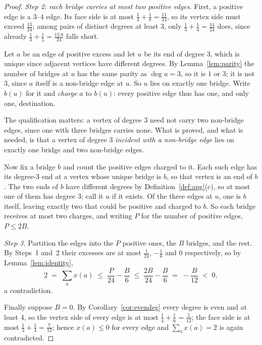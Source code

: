 \documentclass[11pt,a4paper]{amsart}
\theoremstyle{plain}
\theoremstyle{definition}
\begin{document}
\begin{proof}
\smallskip
\emph{Step 2: each bridge carries at most two positive edges.} First, a positive
edge is a $3$--$4$ edge. Its face side is at most $\tfrac13+\tfrac18 =
\tfrac{11}{24}$, so its vertex side must exceed $\tfrac{13}{24}$; among pairs of
distinct degrees at least $3$, only $\tfrac13+\tfrac14 = \tfrac{14}{24}$ does,
since already $\tfrac13+\tfrac15 = \tfrac{12.8}{24}$ falls short.

Let $a$ be an edge of positive excess and let $u$ be its end of degree $3$,
which is unique since adjacent vertices have different degrees. By
Lemma~\ref{lem:parity} the number of bridges at $u$ has the same parity as
$\deg u = 3$, so it is $1$ or $3$; it is not $3$, since $a$ itself is a
non-bridge edge at $u$. So $u$ lies on exactly one bridge. Write $b(u)$ for it
and \emph{charge} $a$ to $b(u)$: every positive edge thus has one, and only one,
destination.

The qualification matters: a vertex of degree $3$ need not carry two non-bridge
edges, since one with three bridges carries none. What is proved, and what is
needed, is that a vertex of degree $3$ \emph{incident with a non-bridge edge}
lies on exactly one bridge and two non-bridge edges.

Now fix a bridge $b$ and count the positive edges charged to it. Each such edge
has its degree-$3$ end at a vertex whose unique bridge is $b$, so that vertex is
an end of $b$. The two ends of $b$ have different degrees by
Definition~\ref{def:apg}(c), so at most one of them has degree $3$; call it $u$
if it exists. Of the three edges at $u$, one is $b$ itself, leaving exactly two
that could be positive and charged to $b$. So each bridge receives at most two
charges, and writing $P$ for the number of positive edges, $P \le 2B$.

\smallskip
\emph{Step 3.} Partition the edges into the $P$ positive ones, the $B$ bridges,
and the rest. By Steps~1 and~2 their excesses are at most $\tfrac1{24}$,
$-\tfrac16$ and $0$ respectively, so by Lemma~\ref{lem:identity},
\[
  2 \;=\; \sum_a x(a) \;\le\; \frac{P}{24} - \frac{B}{6}
     \;\le\; \frac{2B}{24} - \frac{B}{6} \;=\; -\frac{B}{12} \;<\; 0 ,
\]
a contradiction.

\smallskip
Finally suppose $B = 0$. By Corollary~\ref{cor:evendeg} every degree is even and
at least $4$, so the vertex side of every edge is at most $\tfrac14+\tfrac16 =
\tfrac5{12}$; the face side is at most $\tfrac13+\tfrac14 = \tfrac7{12}$; hence
$x(a) \le 0$ for every edge and $\sum_a x(a) = 2$ is again contradicted.
\end{proof}
\end{document}
